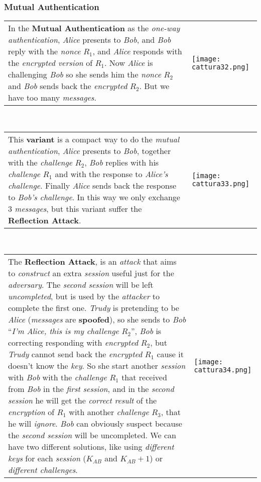 \documentclass{article}
\begin{document}
\subsubsection{Mutual Authentication}
\begin{tabular}{C{11cm}  L{10.5cm}}
In the \textbf{Mutual Authentication} as the \emph{one-way authentication}, \emph{Alice} presents to \emph{Bob}, and \emph{Bob} reply with the \emph{nonce} $R_1$, and \emph{Alice} responds with the \emph{encrypted version} of $R_1$. Now \emph{Alice} is challenging \emph{Bob} so she sends him the \emph{nonce} $R_2$ and \emph{Bob} sends back the \emph{encrypted} $R_2$. But we have too many \emph{messages}. 
& \texttt{[image: cattura32.png]}
\end{tabular}
\hfill \break
\\
\begin{tabular}{C{11cm}  L{10.5cm}}
This \textbf{variant} is a compact way to do the \emph{mutual authentication}, \emph{Alice} presents to \emph{Bob}, together with the \emph{challenge} $R_2$, \emph{Bob} replies with his \emph{challenge} $R_1$ and with the response to \emph{Alice's challenge}. Finally \emph{Alice} sends back the response to \emph{Bob's challenge}. In this way we only exchange 3 \emph{messages}, but this variant suffer the \textbf{Reflection Attack}.
& \texttt{[image: cattura33.png]}
\end{tabular}
\hfill \break
\\
\begin{tabular}{C{11cm}  L{10.5cm}}
The \textbf{Reflection Attack}, is an \emph{attack} that aims to \emph{construct} an extra \emph{session} useful just for the \emph{adversary}. The \emph{second session} will be left \emph{uncompleted}, but is used by the \emph{attacker} to complete the first one. \emph{Trudy} is pretending to be \emph{Alice} (\emph{messages} are \textbf{spoofed}), so she sends to \emph{Bob} “\emph{I’m Alice, this is my challenge} $R_2$”, \emph{Bob} is correcting responding with \emph{encrypted} $R_2$, but \emph{Trudy} cannot send back the \emph{encrypted} $R_1$ cause it doesn't know the \emph{key}. So she start another \emph{session} with \emph{Bob} with the \emph{challenge} $R_1$ that received from \emph{Bob} in the \emph{first session}, and in the \emph{second session} he will get the \emph{correct result} of the \emph{encryption} of $R_1$ with another \emph{challenge} $R_3$, that he will \emph{ignore}. \emph{Bob} can obviously suspect because the \emph{second session} will be uncompleted. We can have two different solutions, like using \emph{different keys} for each \emph{session} ($K_{AB}$ and $K_{AB}+1$) or \emph{different challenges}.
& \texttt{[image: cattura34.png]}
\end{tabular}
\end{document}
